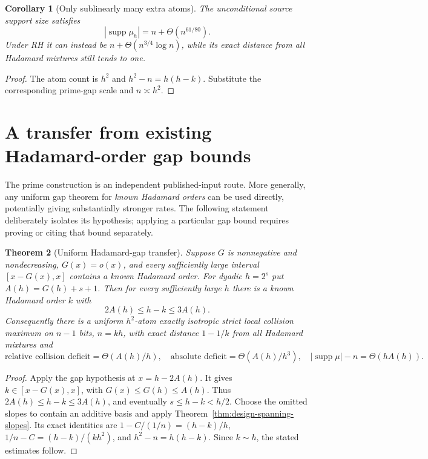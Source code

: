 \documentclass[11pt]{article}
\newtheorem{theorem}{Theorem}[section]
\newtheorem{corollary}[theorem]{Corollary}
\begin{document}
\begin{corollary}[Only sublinearly many extra atoms]
\label{cor:stability-support-excess}
The unconditional source support size satisfies
\[
 |\operatorname{supp}\mu_h|=n+\Theta(n^{61/80}).
\]
Under RH it can instead be $n+\Theta(n^{3/4}\log n)$, while its exact
distance from all Hadamard mixtures still tends to one.
\end{corollary}
\begin{proof}
The atom count is $h^2$ and $h^2-n=h(h-k)$. Substitute the corresponding
prime-gap scale and $n\asymp h^2$.
\end{proof}
\section{A transfer from existing Hadamard-order gap bounds}
\label{sec:stability-hadamard-gap-transfer}
The prime construction is an independent published-input route. More
generally, any uniform gap theorem for \emph{known Hadamard orders}
can be used directly, potentially giving substantially stronger rates.
The following statement deliberately isolates its hypothesis; applying a
particular gap bound requires proving or citing that bound separately.

\begin{theorem}[Uniform Hadamard-gap transfer]
\label{thm:stability-hadamard-gap-transfer}
Suppose $G$ is nonnegative and nondecreasing, $G(x)=o(x)$, and every
sufficiently large interval $[x-G(x),x]$ contains a known Hadamard order.
For dyadic $h=2^s$ put $A(h)=G(h)+s+1$. Then for every sufficiently large
$h$ there is a known Hadamard order $k$ with
\[
 2A(h)\le h-k\le3A(h).
\]
Consequently there is a uniform $h^2$-atom exactly isotropic strict local
collision maximum on $n-1$ bits, $n=kh$, with exact distance $1-1/k$
from all Hadamard mixtures and
\[
 \text{relative collision deficit}=\Theta(A(h)/h),\quad
 \text{absolute deficit}=\Theta(A(h)/h^3),\quad
 |\operatorname{supp}\mu|-n=\Theta(hA(h)).
\]
\end{theorem}
\begin{proof}
Apply the gap hypothesis at $x=h-2A(h)$. It gives
$k\in[x-G(x),x]$, with $G(x)\le G(h)\le A(h)$.
Thus $2A(h)\le h-k\le3A(h)$, and eventually
$s\le h-k<h/2$. Choose the omitted slopes to contain an additive basis
and apply Theorem~\ref{thm:design-spanning-slopes}. Its exact identities
are $1-C/(1/n)=(h-k)/h$, $1/n-C=(h-k)/(kh^2)$, and
$h^2-n=h(h-k)$. Since $k\sim h$, the stated estimates follow.
\end{proof}
\end{document}
